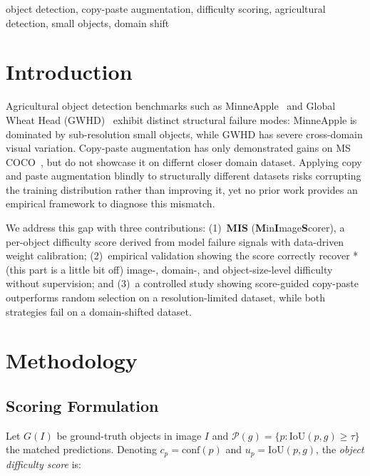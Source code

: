 \documentclass[conference]{IEEEtran}
\begin{document}
\begin{IEEEkeywords}
object detection, copy-paste augmentation, difficulty scoring,
agricultural detection, small objects, domain shift
\end{IEEEkeywords}

\section{Introduction}

Agricultural object detection benchmarks such as
MinneApple~\cite{hani2020minneapple} and Global Wheat Head
(GWHD)~\cite{david2021global} exhibit distinct structural failure
modes: MinneApple is dominated by sub-resolution small objects, while
GWHD has severe cross-domain visual variation. Copy-paste augmentation
has only demonstrated gains on MS COCO~\cite{kisantal2019augmentation,
ghiasi2021simple}, but do not showcase it on differnt closer domain dataset. 
Applying copy and paste augmentation blindly to structurally different datasets 
risks corrupting the training distribution rather than improving it, yet no prior work
provides an empirical framework to diagnose this mismatch.

We address this gap with three contributions: (1)~\textbf{MIS}
(\textbf{M}in\textbf{I}mage\textbf{S}corer), a per-object difficulty
score derived from model failure signals with data-driven weight
calibration; (2)~empirical validation showing the score correctly
recover *(this part is a little bit off) image-, domain-, and object-size-level difficulty without
supervision; and (3)~a controlled study showing score-guided
copy-paste outperforms random selection on a resolution-limited dataset,
while both strategies fail on a domain-shifted dataset.

\section{Methodology}

\subsection{Scoring Formulation}

Let $G(I)$ be ground-truth objects in image $I$ and
$\mathcal{P}(g) = \{p : \mathrm{IoU}(p,g) \ge \tau\}$
the matched predictions. Denoting $c_p = \mathrm{conf}(p)$
and $u_p = \mathrm{IoU}(p,g)$, the \emph{object difficulty score} is:
\end{document}
